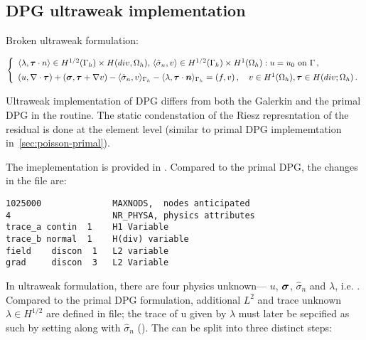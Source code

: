 \subsection{DPG ultraweak implementation}
\label{sec:poisson-ultraweak}
Broken ultraweak formulation:

\[
\left\{
\begin{array}{llll}
	\left\langle \lambda, \boldsymbol \tau \cdot n \right\rangle \in H^{1/2}(\Gamma_h) \times H(div,\Omega_h),\,\left \langle \hat{\sigma}_n,v \right \rangle \in H^{1/2}(\Gamma_h) \times H^1(\Omega_h):  u = u_0 \text{ on } \Gamma \, , \\[5pt]
	(u, \nabla \cdot \boldsymbol \tau) + (\boldsymbol \sigma, \boldsymbol \tau + \nabla v) - \langle \hat{\sigma}_n , v \rangle_{\Gamma_h} -  \langle \lambda, \boldsymbol \tau \cdot \boldsymbol n \rangle_{\Gamma_h} 
	= (f,v) \, ,\quad v \in H^1(\Omega_h), \boldsymbol \tau \in H(div; \Omega_h) \, .
\end{array}
\right.
\]

Ultraweak implementation of DPG differs from both the Galerkin and the primal DPG in the  routine. The static condenstation of the Riesz represntation of the residual is done at the element level (similar to primal DPG implememtation in~\ref{sec:poisson-primal}). 

The imeplementation is provided in .
Compared to the primal DPG, the changes in the  file are:

\begin{lstlisting}[caption=\file{POISSON/ULTRAWEAK\_DPG/input/physics} input file.]
1025000              MAXNODS,  nodes anticipated
4                    NR_PHYSA, physics attributes
trace_a contin  1    H1 Variable
trace_b normal  1    H(div) variable
field    discon  1   L2 variable
grad     discon  3   L2 Variable
\end{lstlisting}

In ultraweak formulation, there are four physics unknown--- $u$, $\boldsymbol \sigma$, $\hat{\sigma}_n$ and $\lambda$, i.e. . Compared to the primal DPG formulation, additional $L^2$ and trace unknown $\lambda \in H^{1/2}$ are defined in  file; the trace of u given by $\lambda$ must later be sepcified as such by setting  along with $\hat{\sigma}_n$ (). The  can be split into three distinct steps:

